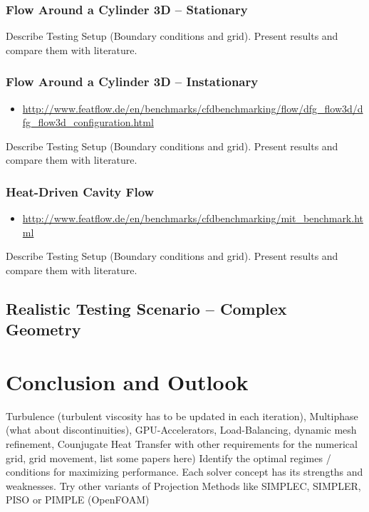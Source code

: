 \documentclass[article,type=msc,colorback,accentcolor=tud2a]{tudthesis}
\begin{document}
      \subsubsection{Flow Around a Cylinder 3D -- Stationary}
        Describe Testing Setup (Boundary conditions and grid). Present results and compare them with literature.
      \subsubsection{Flow Around a Cylinder 3D -- Instationary}
        \begin{itemize}
          \item\url{http://www.featflow.de/en/benchmarks/cfdbenchmarking/flow/dfg_flow3d/dfg_flow3d_configuration.html}
        \end{itemize}
        Describe Testing Setup (Boundary conditions and grid). Present results and compare them with literature.

      \subsubsection{Heat-Driven Cavity Flow}
        \begin{itemize}
          \item \url{http://www.featflow.de/en/benchmarks/cfdbenchmarking/mit_benchmark.html}
        \end{itemize}
        Describe Testing Setup (Boundary conditions and grid). Present results and compare them with literature.
    \subsection{Realistic Testing Scenario -- Complex Geometry}
        
  \section{Conclusion and Outlook}
  Turbulence (turbulent viscosity has to be updated in each iteration), Multiphase (what about discontinuities), GPU-Accelerators, Load-Balancing, dynamic mesh refinement, Counjugate Heat Transfer with other requirements for the numerical grid, grid movement, list some papers here)
    Identify the optimal regimes / conditions for maximizing performance. Each solver concept has its strengths and weaknesses.
    Try other variants of Projection Methods like SIMPLEC, SIMPLER, PISO or PIMPLE (OpenFOAM)

    \nocite{*}

{}

\end{document}
